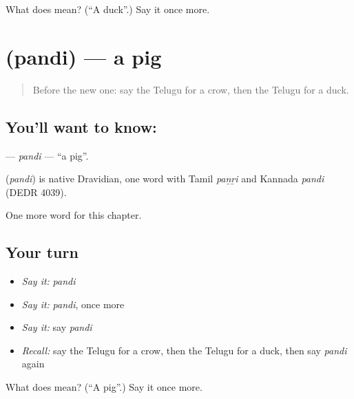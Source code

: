 \begin{tcolorbox}[breakable,colback=teal!4,colframe=teal!35!black,title={Before you move on}]
What does  mean? (\textquotedblleft{}A duck\textquotedblright{}.) Say it once more.
\end{tcolorbox}
\section[\texorpdfstring{\te{పంది} (pandi)}{పంది (pandi)}]{ (pandi) — a pig}

\label{lesson:TE-C126-pandi}



\begin{quote}
Before the new one: say the Telugu for a crow, then the Telugu for a duck.
\end{quote}

\subsection*{You'll want to know: }
\textbf{} — \emph{pandi} — \textquotedblleft{}a pig\textquotedblright{}.

\begin{cousinweb}
\textbf{} (\emph{pandi}) is native Dravidian, one word with Tamil \emph{paṉṟi} and Kannada \emph{pandi} (DEDR 4039).
\end{cousinweb}

\begin{grammarlens}[title={What you've built}]
One more word for this chapter.
\end{grammarlens}

\subsection*{Your turn}
\begin{itemize}
\raggedright
  \item \emph{Say it:} \emph{pandi}
  \item \emph{Say it:} \emph{pandi}, once more
  \item \emph{Say it:} say \emph{pandi}
  \item \emph{Recall:} say the Telugu for a crow, then the Telugu for a duck, then say \emph{pandi} again
\end{itemize}

\begin{tcolorbox}[breakable,colback=teal!4,colframe=teal!35!black,title={Before you move on}]
What does  mean? (\textquotedblleft{}A pig\textquotedblright{}.) Say it once more.
\end{tcolorbox}
